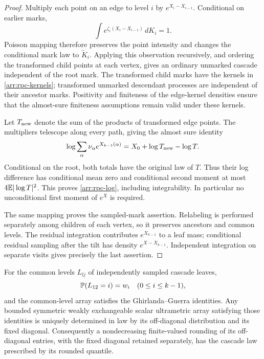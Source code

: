 \begin{proof}
Multiply each point on an edge to level $i$ by
$e^{X_i-X_{i-1}}$. Conditional on earlier marks,
\[
 \int e^{\zeta_i(X_i-X_{i-1})}\,dK_i=1.
\]
Poisson mapping therefore preserves the point intensity and changes
the conditional mark law to $\widetilde K_i$. Applying this observation
recursively, and ordering the transformed child points at each vertex,
gives an ordinary unmarked cascade independent of the root mark. The
transformed child marks have the kernels in
\eqref{arr:rpc-kernels}; transformed unmarked descendant processes are
independent of their ancestor marks. Positivity and finiteness of the
edge-kernel densities ensure that the almost-sure finiteness assumptions remain
valid under these kernels.

Let $T_{\rm new}$ denote the sum of the products of transformed edge
points. The multipliers telescope along every path, giving the almost
sure identity
\begin{equation}\label{arr:rpc-total}
 \log\sum_\alpha\nu_\alpha e^{X_{k-1}(\alpha)}
 =X_0+\log T_{\rm new}-\log T.
\end{equation}
Conditional on the root, both totals have the original law of $T$.
Thus their log difference has conditional mean zero and conditional
second moment at most $4\mathbb E|\log T|^2$. This proves
\eqref{arr:rpc-log}, including integrability. In particular no
unconditional first moment of $e^X$ is required.

The same mapping proves the sampled-mark assertion. Relabeling is
performed separately among children of each vertex, so it preserves
ancestors and common levels. The residual integration contributes
$e^{X_{k-1}}$ to a leaf mass; conditional residual sampling after the
tilt has density $e^{X-X_{k-1}}$. Independent integration on separate
visits gives precisely the last assertion.
\end{proof}

\begin{lemma}\label{arr:rpc-gg}
For the common levels $L_{lj}$ of independently sampled cascade leaves,
\[
 \mathbb P(L_{12}=i)=w_i\quad(0\leq i\leq k-1),
\]
and the common-level array satisfies the Ghirlanda--Guerra identities.
Any bounded symmetric weakly exchangeable scalar ultrametric array
satisfying those identities is
uniquely determined in law by its off-diagonal distribution and its
fixed diagonal. Consequently a nondecreasing finite-valued rounding of
its off-diagonal entries, with the fixed diagonal retained separately,
has the cascade law prescribed by its rounded quantile.
\end{lemma}

